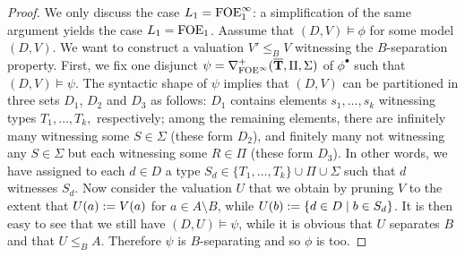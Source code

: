 \begin{proof}
We only discuss the case $\oslang = \ofoei$: a simplification of the same 
argument yields the case $\oslang = \ofoe$. 
Aassume that $(D,V) \models \phi$ for some model $(D,V)$. 
We want to construct a valuation $V' \leq_{B} V$ witnessing the $B$-separation
property. 
First, we fix one disjunct 
$\psi = \mondbnfofoei{\vlist{T}}{\Pi}{\Sigma}{+}$ of $\phi^{\bullet}$ such that
$(D,V) \models \psi$. 
The syntactic shape of $\psi$ implies that $(D,V)$ can be partitioned in three 
sets $D_1$, $D_2$ and $D_3$ as follows: $D_1$ contains elements $s_1, \dots,
s_k$ witnessing types $T_1,\dots, T_k,$ respectively; among the remaining
elements, there are infinitely many witnessing some $S\in \Sigma$ (these form
$D_2$), and finitely many not witnessing any $S \in \Sigma$ but each witnessing
some $R \in \Pi$ (these form $D_3$). 
In other words, we have assigned to each $d \in D$ a type $S_{d} \in
\{T_1, \dots, T_k\} \cup \Pi \cup \Sigma$ such that $d$ witnesses $S_{d}$.
Now consider the valuation $U$ that we obtain by pruning $V$ to the extent
that $U(a) \isdef V(a)$ for $a \in A \setminus B$, while $U(b) \isdef 
\{ d \in D \mid b \in S_{d}\}$.
It is then easy to see that we still have $(D,U) \models \psi$, while it is 
obvious that $U$ separates $B$ and that $U \leq_{B} A$.
Therefore $\psi$ is $B$-separating and so $\phi$ is too.
\end{proof}





